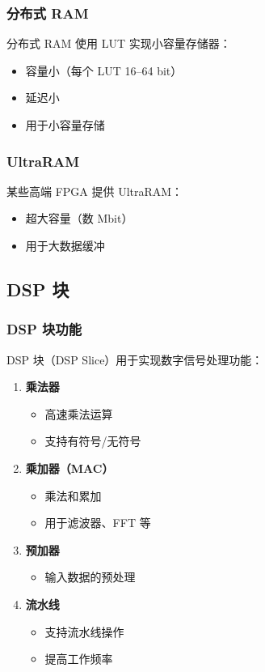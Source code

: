 \subsubsection{分布式 RAM}

分布式 RAM 使用 LUT 实现小容量存储器：
\begin{itemize}
  \item 容量小（每个 LUT 16--64 bit）
  \item 延迟小
  \item 用于小容量存储
\end{itemize}

\subsubsection{UltraRAM}

某些高端 FPGA 提供 UltraRAM：
\begin{itemize}
  \item 超大容量（数 Mbit）
  \item 用于大数据缓冲
\end{itemize}

\subsection{DSP 块}

\subsubsection{DSP 块功能}

DSP 块（DSP Slice）用于实现数字信号处理功能：

\begin{enumerate}
  \item \textbf{乘法器}
    \begin{itemize}
      \item 高速乘法运算
      \item 支持有符号/无符号
    \end{itemize}

  \item \textbf{乘加器（MAC）}
    \begin{itemize}
      \item 乘法和累加
      \item 用于滤波器、FFT 等
    \end{itemize}

  \item \textbf{预加器}
    \begin{itemize}
      \item 输入数据的预处理
    \end{itemize}

  \item \textbf{流水线}
    \begin{itemize}
      \item 支持流水线操作
      \item 提高工作频率
    \end{itemize}
\end{enumerate}

